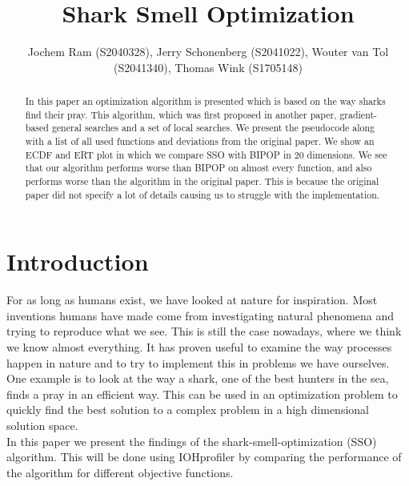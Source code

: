 \documentclass[runningheads]{llncs}
\begin{document}
%
\title{Shark Smell Optimization}
%

%
\author{Jochem Ram (S2040328), Jerry Schonenberg (S2041022), Wouter van Tol (S2041340), Thomas Wink (S1705148)}
%


%
%
\maketitle              %
%


\begin{abstract}
In this paper an optimization algorithm is presented which is based on the way sharks find their pray. This algorithm, which was first proposed in another paper\cite{abedinia2014shark}, gradient-based general searches and a set of local searches. We present the pseudocode along with a list of all used functions and deviations from the original paper. We show an ECDF and ERT plot in which we compare SSO with BIPOP\cite{COCOperformace} in 20 dimensions. We see that our algorithm performs worse than BIPOP on almost every function, and also performs worse than the algorithm in the original paper. This is because the original paper did not specify a lot of details causing us to struggle with the implementation. 
\end{abstract}





\section{Introduction}
For as long as humans exist, we have looked at nature for inspiration. Most inventions humans have made come from investigating natural phenomena and trying to reproduce what we see. This is still the case nowadays, where we think we know almost everything. It has proven useful to examine the way processes happen in nature and to try to implement this in problems we have ourselves. One example is to look at the way a shark, one of the best hunters in the sea, finds a pray in an efficient way. This can be used in an optimization problem to quickly find the best solution to a complex problem in a high dimensional solution space.\\
In this paper we present the findings of the shark-smell-optimization (SSO)\cite{abedinia2014shark} algorithm. This will be done using IOHprofiler by comparing the performance of the algorithm for different objective functions.
\end{document}
